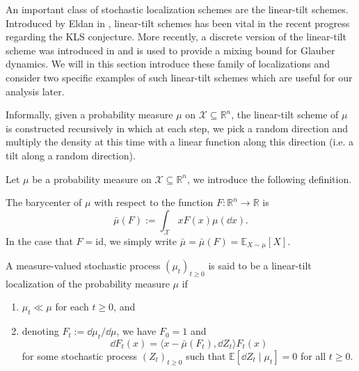 An important class of stochastic localization schemes are the linear-tilt schemes. Introduced by Eldan 
in \cite{Eldan_2013}, linear-tilt schemes has been vital in the recent progress regarding the KLS 
conjecture. More recently, a discrete version of the linear-tilt scheme was introduced in \cite{Chen_2022}
and is used to provide a mixing bound for Glauber dynamics. We will in this section introduce these family 
of localizations and consider two specific examples of such linear-tilt schemes which are 
useful for our analysis later.

Informally, given a probability measure \(\mu\) on \(\mathcal{X} \subseteq \mathbb{R}^n\), the linear-tilt scheme
of \(\mu\) is constructed recursively in which at each step, we pick a random direction and multiply 
the density at this time with a linear function along this direction (i.e. a tilt along a random 
direction). 

Let \(\mu\) be a probability measure on \(\mathcal{X} \subseteq \mathbb{R}^n\), we introduce the following definition.
\begin{definition}[Barycenter]
  The barycenter of \(\mu\) with respect to the function \(F : \mathbb{R}^n \to \mathbb{R}\) is
  \[\bar{\mu}(F) := \int_{\mathcal{X}} x F(x) \mu(\dd x).\]
  In the case that \(F = \text{id}\), we simply write \(\bar{\mu} = \bar{\mu}(F) = \mathbb{E}_{X \sim \mu}[X]\).
\end{definition}

\begin{definition}
  A measure-valued stochastic process \((\mu_t)_{t \ge 0}\) is said to be a linear-tilt localization of
  the probability measure \(\mu\) if 
  \begin{enumerate}
    \item \(\mu_t \ll \mu\) for each \(t \ge 0\), and 
    \item denoting \(F_t := \dd \mu_t / \dd \mu\), we have \(F_0 = 1\) and 
      \begin{equation}\label{eq:linear-tilt}
        \dd F_t(x) = \langle x - \bar{\mu}(F_t), \dd Z_t \rangle F_t(x)
      \end{equation}
      for some stochastic process \((Z_t)_{t \ge 0}\) such that \(\mathbb{E}[\dd Z_t \mid \mu_t] = 0\) 
      for all \(t \ge 0\). 
  \end{enumerate} 
\end{definition}

